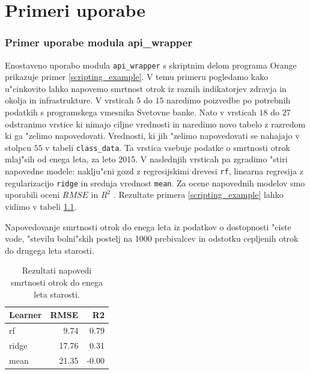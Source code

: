 \chapter{Primeri uporabe}




\subsection{Primer uporabe modula api\_wrapper}

Enostaveno uporabo modula \verb|api_wrapper| s skriptnim delom programa Orange
prikazuje primer \ref{scripting_example}. V temu primeru pogledamo kako
u"cinkovito lahko napovemo smrtnost otrok iz raznih indikatorjev zdravja in
okolja in infrastrukture. V vrsticah $5$ do $15$ naredimo poizvedbe po
potrebnih podatkih s programskega vmesnika Svetovne banke. Nato v vrsticah $18$
do $27$ odstranimo vrstice ki nimajo ciljne vrednosti in naredimo novo tabelo z
razredom ki ga "zelimo napovedovati. Vrednosti, ki jih "zelimo napovedovati se
nahajajo v stolpcu $55$ v tabeli \verb|class_data|. Ta vrstica vsebuje podatke
o smrtnosti otrok mlaj"sih od enega leta, za leto 2015. V naslednjih vrsticah
pa zgradimo "stiri napovedne modele: naklju"cni gozd z
regresijskimi drevesi \verb|rf|, linearna regresija z regularizacijo 
\verb|ridge| in srednja vrednost \verb|mean|.
Za ocene napovednih modelov smo uporabili oceni
$RMSE$  in 
$R^2$ .
Rezultate primera \ref{scripting_example} lahko vidimo v tabeli 
\ref{rezultati_skripte}.


\begin{snippet}
\begin{center}

\end{center}
\cprotect
\caption{Napovedovanje smrtnosti otrok do enega leta iz podatkov o dostopnosti
  "ciste vode, "stevilu bolni"skih postelj na 1000 prebivalcev in odstotku
  cepljenih otrok do drugega leta starosti.}
\label{scripting_example}
\end{snippet} 

\begin{table}
\begin{center}

\begin{tabular}{l|r|r}
  Learner & RMSE & R2      \\ \hline
 
  rf & 9.74 & 0.79 \\
  ridge & 17.76 & 0.31 \\
  mean & 21.35 & -0.00

\end{tabular}
\end{center}
\cprotect
\caption{Rezultati napovedi smrtnosti otrok do enega leta starosti.}
\label{rezultati_skripte}
\end{table} 



